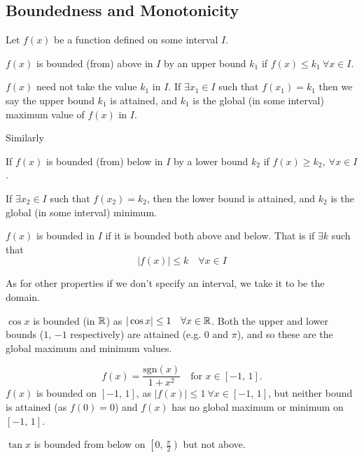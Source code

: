 \documentclass[10pt, a4paper]{article}
\begin{document}
\subsection{Boundedness and Monotonicity}
Let $f(x)$ be a function defined on some interval $I$.
\begin{definition}
    $f(x)$ is bounded (from) above in $I$ by an upper bound $k_1$ if $f(x) \leq k_1\ \forall x \in I$.
\end{definition}

$f(x)$ need not take the value $k_1$ in $I$.
If $\exists x_1 \in I$ such that $f(x_1) = k_1$ then
we say the upper bound $k_1$ is attained,
and $k_1$ is the global (in some interval) maximum value of $f(x)$ in $I$.

Similarly
\begin{definition}
    If $f(x)$ is bounded (from) below in $I$ by a lower bound $k_2$ if $f(x) \geq k_2,\ \forall x \in I$.
\end{definition}

If $\exists x_2 \in I$ such that $f(x_2) = k_2$,
then the lower bound is attained,
and $k_2$ is the global (in some interval) minimum.

\begin{definition}
    $f(x)$ is bounded in $I$ if it is bounded both above and below.
    That is if $\exists k$ such that
    \[
    |f(x)| \leq k\quad\forall x \in I
    \]
\end{definition}

As for other properties if we don't specify an interval,
we take it to be the domain.

\begin{example}
    $\cos x$ is bounded (in $\mathbb{R}$) as $|\cos x| \leq 1\quad\forall x \in \mathbb{R}$.
    Both the upper and lower bounds ($1$, $-1$ respectively) are attained (e.g. $0$ and $\pi$),
    and so these are the global maximum and minimum values.
\end{example}

\begin{example}
    \[
    f(x) = \frac{\mathrm{sgn}(x)}{1 + x ^ 2}\quad\text{for } x \in [-1,\,1].
    \]
    $f(x)$ is bounded on $[-1,\, 1]$,
    as $|f(x)| \leq 1\ \forall x \in [-1,\,1]$,
    but neither bound is attained (as $f(0) = 0$) and $f(x)$ has no global maximum or minimum on $[-1,\,1]$.
\end{example}

\begin{example}
    $\tan x$ is bounded from below on $\left[0,\,\frac{\pi}{2}\right)$ but not above.
\end{example}
\end{document}
